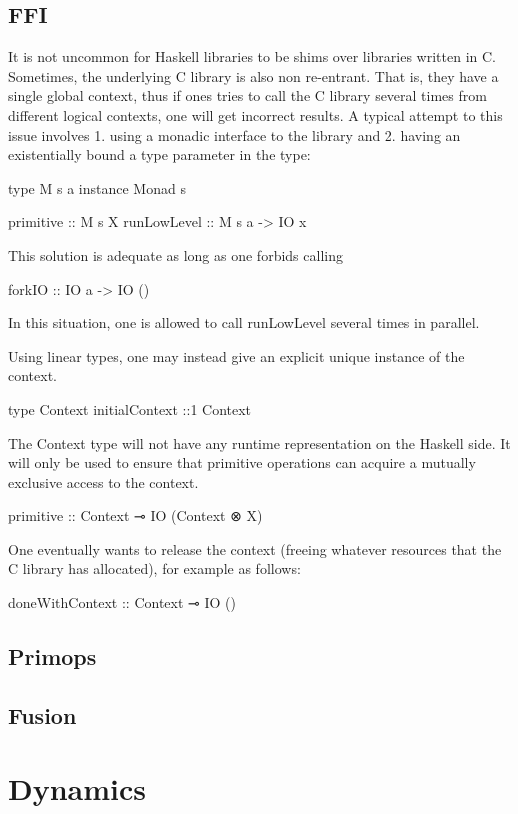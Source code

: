 \documentclass[11pt]{article}
\begin{document}
\subsection{FFI}
\label{sec:ffi}

It is not uncommon for Haskell libraries to be shims over libraries
written in C. Sometimes, the underlying C library is also non
re-entrant. That is, they have a single global context, thus if ones
tries to call the C library several times from different logical
contexts, one will get incorrect results. A typical attempt to this
issue involves
1. using a monadic interface to the library and
2. having an existentially bound a type parameter in the type:

type M s a
instance Monad s

primitive :: M s X
runLowLevel :: M s a -> IO x

This solution is adequate as long as one forbids calling

forkIO :: IO a -> IO ()

In this situation, one is allowed to call runLowLevel several times in
parallel.

Using linear types, one may instead give an explicit unique instance
of the context.

type Context
initialContext ::1 Context

The Context type will not have any runtime representation on the
Haskell side.  It will only be used to ensure that primitive
operations can acquire a mutually exclusive access to the context.

primitive :: Context ⊸ IO (Context ⊗ X)

One eventually wants to release the context (freeing whatever
resources that the C library has allocated), for example as follows:

doneWithContext :: Context ⊸ IO ()

\subsection{Primops}

\subsection{Fusion}
\label{sec:fusion}

\section{Dynamics}
\label{sec:orgheadline16}
\end{document}
